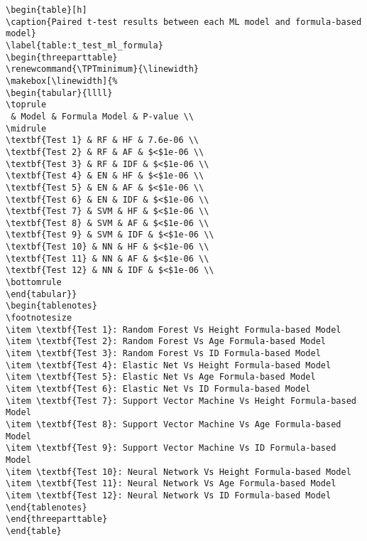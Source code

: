 \documentclass[11pt]{article}
\begin{document}
\begin{Verbatim}[tabsize=4]
\begin{table}[h]
\caption{Paired t-test results between each ML model and formula-based model}
\label{table:t_test_ml_formula}
\begin{threeparttable}
\renewcommand{\TPTminimum}{\linewidth}
\makebox[\linewidth]{%
\begin{tabular}{llll}
\toprule
 & Model & Formula Model & P-value \\
\midrule
\textbf{Test 1} & RF & HF & 7.6e-06 \\
\textbf{Test 2} & RF & AF & $<$1e-06 \\
\textbf{Test 3} & RF & IDF & $<$1e-06 \\
\textbf{Test 4} & EN & HF & $<$1e-06 \\
\textbf{Test 5} & EN & AF & $<$1e-06 \\
\textbf{Test 6} & EN & IDF & $<$1e-06 \\
\textbf{Test 7} & SVM & HF & $<$1e-06 \\
\textbf{Test 8} & SVM & AF & $<$1e-06 \\
\textbf{Test 9} & SVM & IDF & $<$1e-06 \\
\textbf{Test 10} & NN & HF & $<$1e-06 \\
\textbf{Test 11} & NN & AF & $<$1e-06 \\
\textbf{Test 12} & NN & IDF & $<$1e-06 \\
\bottomrule
\end{tabular}}
\begin{tablenotes}
\footnotesize
\item \textbf{Test 1}: Random Forest Vs Height Formula-based Model
\item \textbf{Test 2}: Random Forest Vs Age Formula-based Model
\item \textbf{Test 3}: Random Forest Vs ID Formula-based Model
\item \textbf{Test 4}: Elastic Net Vs Height Formula-based Model
\item \textbf{Test 5}: Elastic Net Vs Age Formula-based Model
\item \textbf{Test 6}: Elastic Net Vs ID Formula-based Model
\item \textbf{Test 7}: Support Vector Machine Vs Height Formula-based Model
\item \textbf{Test 8}: Support Vector Machine Vs Age Formula-based Model
\item \textbf{Test 9}: Support Vector Machine Vs ID Formula-based Model
\item \textbf{Test 10}: Neural Network Vs Height Formula-based Model
\item \textbf{Test 11}: Neural Network Vs Age Formula-based Model
\item \textbf{Test 12}: Neural Network Vs ID Formula-based Model
\end{tablenotes}
\end{threeparttable}
\end{table}

\end{Verbatim}




\end{document}
